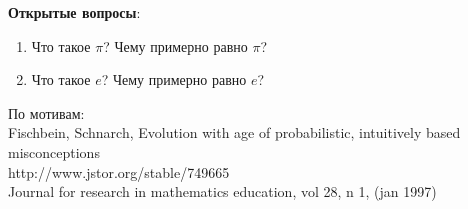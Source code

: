 \documentclass{article}
\begin{document}
\textbf{Открытые вопросы}:

\begin{enumerate}
\item Что такое $\pi$? Чему примерно равно $\pi$?
\item Что такое $e$? Чему примерно равно $e$?
\end{enumerate}

\newpage
По мотивам: \\
Fischbein, Schnarch, Evolution with age of probabilistic, intuitively based misconceptions \\
http://www.jstor.org/stable/749665 \\
Journal for research in mathematics education, vol 28, n 1, (jan 1997) \\
\end{document}
